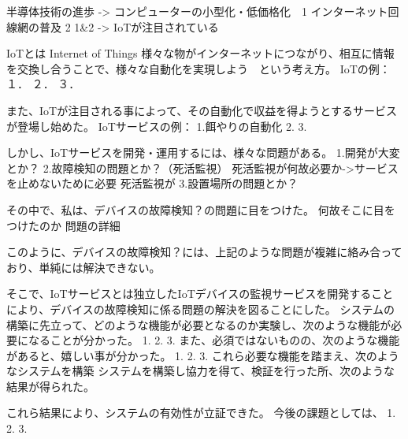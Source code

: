  半導体技術の進歩 -> コンピューターの小型化・低価格化　1
 インターネット回線網の普及 2
 1\&2 -> IoTが注目されている

 IoTとは
 Internet of Things
 様々な物がインターネットにつながり、相互に情報を交換し合うことで、様々な自動化を実現しよう　という考え方。
 IoTの例：
１．
２．
３．

 また、IoTが注目される事によって、その自動化で収益を得ようとするサービスが登場し始めた。
 IoTサービスの例：
 1.餌やりの自動化
 2.
 3.

 しかし、IoTサービスを開発・運用するには、様々な問題がある。
 1.開発が大変とか？
 2.故障検知の問題とか？（死活監視）
	死活監視が何故必要か->サービスを止めないために必要
	死活監視が
 3.設置場所の問題とか？

その中で、私は、デバイスの故障検知？の問題に目をつけた。
何故そこに目をつけたのか
問題の詳細

このように、デバイスの故障検知？には、上記のような問題が複雑に絡み合っており、単純には解決できない。

そこで、IoTサービスとは独立したIoTデバイスの監視サービスを開発することにより、デバイスの故障検知に係る問題の解決を図ることにした。
システムの構築に先立って、どのような機能が必要となるのか実験し、次のような機能が必要になることが分かった。
1.
2.
3.
また、必須ではないものの、次のような機能があると、嬉しい事が分かった。
1.
2.
3.
これら必要な機能を踏まえ、次のようなシステムを構築
システムを構築し協力を得て、検証を行った所、次のような結果が得られた。

これら結果により、システムの有効性が立証できた。
今後の課題としては、
1.
2.
3.
